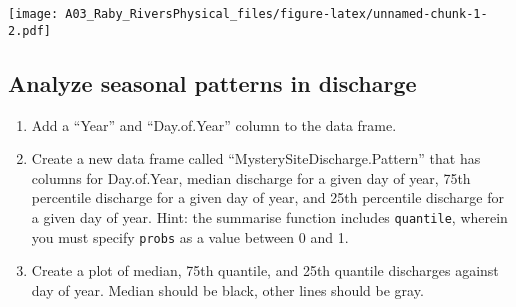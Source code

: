 \documentclass[]{article}
\newenvironment{Shaded}{\begin{snugshade}}{\end{snugshade}}
\newcommand{\CommentTok}[1]{\textcolor[rgb]{0.56,0.35,0.01}{\textit{#1}}}
\providecommand{\tightlist}{%
  \setlength{\itemsep}{0pt}\setlength{\parskip}{0pt}}
\begin{document}
\texttt{[image: A03\_Raby\_RiversPhysical\_files/figure-latex/unnamed-chunk-1-2.pdf]}

\begin{Shaded}
\end{Shaded}

\hypertarget{analyze-seasonal-patterns-in-discharge}{%
\subsection{Analyze seasonal patterns in
discharge}\label{analyze-seasonal-patterns-in-discharge}}

\begin{enumerate}
\def\labelenumi{\arabic{enumi}.}
\setcounter{enumi}{4}
\tightlist
\item
  Add a ``Year'' and ``Day.of.Year'' column to the data frame.
\item
  Create a new data frame called ``MysterySiteDischarge.Pattern'' that
  has columns for Day.of.Year, median discharge for a given day of year,
  75th percentile discharge for a given day of year, and 25th percentile
  discharge for a given day of year. Hint: the summarise function
  includes \texttt{quantile}, wherein you must specify \texttt{probs} as
  a value between 0 and 1.
\item
  Create a plot of median, 75th quantile, and 25th quantile discharges
  against day of year. Median should be black, other lines should be
  gray.
\end{enumerate}
\end{document}
